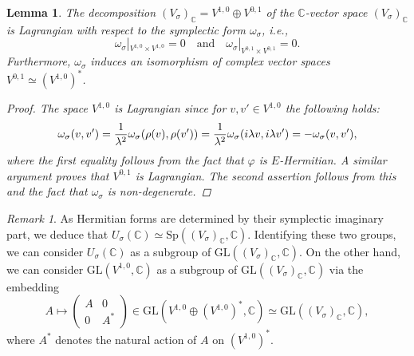 \documentclass[11pt,twoside,a4paper]{amsart}
\newcommand{\0}{\mathscr{O}}
\newcommand{\C}{\mathbb{C}}
\newcommand{\s}{\sigma}
\theoremstyle{plain}
\newtheorem{lem}[thm]{Lemma}
\theoremstyle{definition}
\theoremstyle{remark}
\newtheorem{rmk}[thm]{Remark}
\begin{document}
\begin{lem}
\label{Lem: (V_s)_C=Y+Z}
The decomposition $(V_\s)_\C=V^{1,0}\oplus V^{0,1}$ of the $\C$-vector space $(V_\s)_\C$ is Lagrangian with respect to the symplectic form $\omega_\s$, i.e., 
\[\omega_\s|_{V^{1,0}\times V^{1,0}}=0\quad \text{and}\quad \omega_\s|_{V^{0, 1}\times V^{0,1}}=0.\]
Furthermore, $\omega_\s$ induces an isomorphism of complex vector spaces $V^{0,1}\simeq (V^{1,0})^*$.
\begin{proof}
The space $V^{1,0}$ is Lagrangian since for $v,v'\in V^{1,0}$ the following holds:
\[\omega_\s(v,v') =\frac{1}{\lambda^2 }\omega_\s(\rho (v),\rho (v'))=\frac{1}{\lambda^2 }\omega_\s(i\lambda v,i\lambda v')\\
=-\omega_\s(v,v'),\]
where the first equality follows from the fact that $\varphi$ is $E$-Hermitian. A similar argument proves that $V^{0,1}$ is Lagrangian. The second assertion follows from this and the fact that $\omega_\s$ is non-degenerate.
\end{proof}
\end{lem}
\begin{rmk}
\label{Rmk: subgroups of GL(V_s)}
As Hermitian forms are determined by their symplectic imaginary part, we deduce that $U_\s(\C)\simeq \mathrm{Sp}((V_\s)_\C,\C)$. Identifying these two groups, we can consider $U_\s(\C)$ as a subgroup of $\mathrm{GL}((V_\s)_\C,\C)$.
On the other hand, we can consider $\mathrm{GL}(V^{1,0},\C)$ as a subgroup of $\mathrm{GL}((V_\s)_\C,\C)$ via the embedding
\[
A\longmapsto
\begin{pmatrix}
A & 0\\
0 & A^*
\end{pmatrix}\in \mathrm{GL}(V^{1,0}\oplus(V^{1,0})^*,\C)\simeq\mathrm{GL}((V_\s)_\C,\C),
\]
where $A^*$ denotes the natural action of $A$ on $(V^{1,0})^*$.
\end{rmk}
\end{document}
